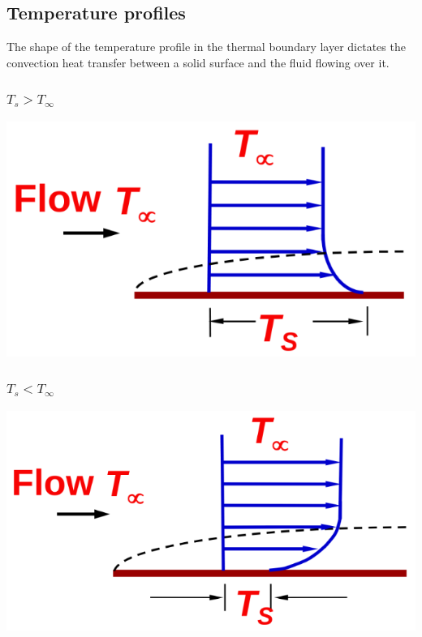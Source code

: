 \documentclass[11pt]{article}
\begin{document}
 \newpage
\subsection{Temperature profiles}
\label{sec:orga4a8fd7}
The shape of the temperature profile in the thermal boundary layer dictates the convection heat transfer between a solid surface and the fluid flowing over it.
\subsubsection{\(T_s > T_{\infty}\)}
\label{sec:org4dc95b9}
\begin{center}
\includegraphics[width=.9\linewidth]{./images/temperature-profile-ts-greater-than-t-infinity.png}
\end{center}
\subsubsection{\(T_s < T_{\infty}\)}
\label{sec:org0a626df}
\begin{center}
\includegraphics[width=.9\linewidth]{./images/temperature-profile-ts-less-than-t-infinity.png}
\end{center}
\end{document}
